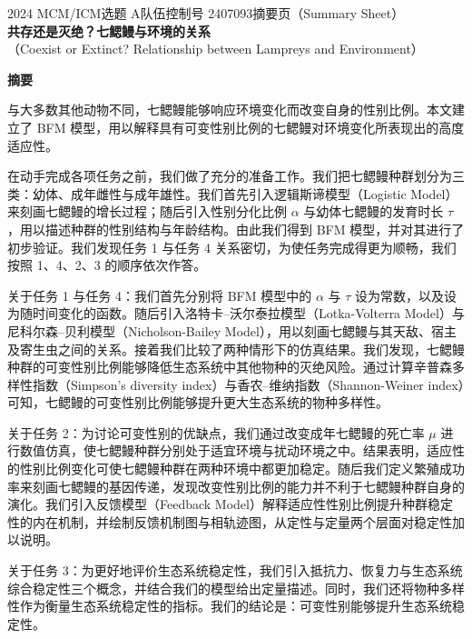 \documentclass[11pt,a4paper]{ctexart}
\begin{document}
\thispagestyle{empty}
\begin{center}
{\small 2024 MCM/ICM\quad 选题 A\quad 队伍控制号 2407093\quad 摘要页（Summary Sheet）}\\[18pt]
{\LARGE\bfseries 共存还是灭绝？七鳃鳗与环境的关系}\\[8pt]
{\large （Coexist or Extinct? Relationship between Lampreys and Environment）}\\[10pt]
\end{center}

\begin{center}
{\large\bfseries 摘\quad 要}
\end{center}

\vspace{6pt}
与大多数其他动物不同，七鳃鳗能够响应环境变化而改变自身的性别比例。本文建立了 BFM 模型，用以解释具有可变性别比例的七鳃鳗对环境变化所表现出的高度适应性。

在动手完成各项任务之前，我们做了充分的准备工作。我们把七鳃鳗种群划分为三类：幼体、成年雌性与成年雄性。我们首先引入逻辑斯谛模型（Logistic Model）来刻画七鳃鳗的增长过程；随后引入性别分化比例 $\alpha$ 与幼体七鳃鳗的发育时长 $\tau$，用以描述种群的性别结构与年龄结构。由此我们得到 BFM 模型，并对其进行了初步验证。我们发现任务 1 与任务 4 关系密切，为使任务完成得更为顺畅，我们按照 1、4、2、3 的顺序依次作答。

关于任务 1 与任务 4：我们首先分别将 BFM 模型中的 $\alpha$ 与 $\tau$ 设为常数，以及设为随时间变化的函数。随后引入洛特卡–沃尔泰拉模型（Lotka-Volterra Model）与尼科尔森–贝利模型（Nicholson-Bailey Model），用以刻画七鳃鳗与其天敌、宿主及寄生虫之间的关系。接着我们比较了两种情形下的仿真结果。我们发现，七鳃鳗种群的可变性别比例能够降低生态系统中其他物种的灭绝风险。通过计算辛普森多样性指数（Simpson's diversity index）与香农–维纳指数（Shannon-Weiner index）可知，七鳃鳗的可变性别比例能够提升更大生态系统的物种多样性。

关于任务 2：为讨论可变性别的优缺点，我们通过改变成年七鳃鳗的死亡率 $\mu$ 进行数值仿真，使七鳃鳗种群分别处于适宜环境与扰动环境之中。结果表明，适应性的性别比例变化可使七鳃鳗种群在两种环境中都更加稳定。随后我们定义繁殖成功率来刻画七鳃鳗的基因传递，发现改变性别比例的能力并不利于七鳃鳗种群自身的演化。我们引入反馈模型（Feedback Model）解释适应性性别比例提升种群稳定性的内在机制，并绘制反馈机制图与相轨迹图，从定性与定量两个层面对稳定性加以说明。

关于任务 3：为更好地评价生态系统稳定性，我们引入抵抗力、恢复力与生态系统综合稳定性三个概念，并结合我们的模型给出定量描述。同时，我们还将物种多样性作为衡量生态系统稳定性的指标。我们的结论是：可变性别能够提升生态系统稳定性。
\end{document}
